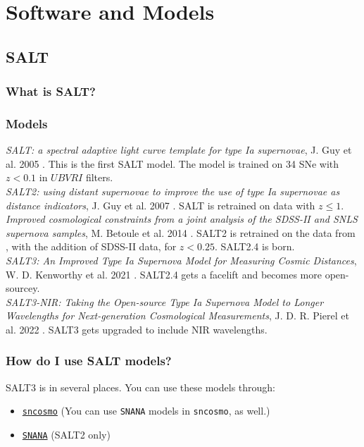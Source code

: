 \section{Software and Models}
\label{sec:software}
\subsection{SALT}
\subsubsection{What is SALT?}


\subsubsection{Models}
\textit{SALT: a spectral adaptive light curve template for type Ia supernovae}, J. Guy et al. 2005 \cite{salt}. This is the first SALT model. The model is trained on 34 SNe with $z < 0.1$ in $UBVRI$ filters. \\

\textit{SALT2: using distant supernovae to improve the use of type Ia supernovae as distance indicators}, J. Guy et al. 2007 \cite{salt2}. SALT is retrained on data with $z \leq 1$. \\

\textit{Improved cosmological constraints from a joint analysis of the SDSS-II and SNLS supernova samples}, M. Betoule et al. 2014 \cite{salt2.4}. SALT2 is retrained on the data from \cite{salt2}, with the addition of SDSS-II data, for $z < 0.25$. SALT2.4 is born. \\

\textit{SALT3: An Improved Type Ia Supernova Model for Measuring Cosmic Distances}, W. D. Kenworthy et al. 2021 \cite{salt3}. SALT2.4 gets a facelift and becomes more open-sourcey. \\

\textit{SALT3-NIR: Taking the Open-source Type Ia Supernova Model to Longer Wavelengths for Next-generation Cosmological Measurements}, J. D. R. Pierel et al. 2022 \cite{salt3nir}. SALT3 gets upgraded to include NIR wavelengths. 

\subsubsection{How do I use SALT models?}
SALT3 is in several places. You can use these models through:
\begin{itemize}
    \item \href{https://sncosmo.readthedocs.io/en/stable/}{\texttt{sncosmo}} (You can use \texttt{SNANA} models in \texttt{sncosmo}, as well.)
    \item \href{https://github.com/RickKessler/SNANA}{\texttt{SNANA}} (SALT2 only)
\end{itemize}

